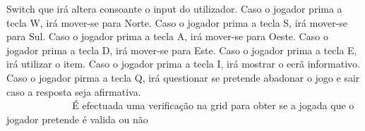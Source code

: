 Switch que irá altera consoante o input do utilizador. Caso o jogador prima a tecla W, irá mover-\/se para Norte. Caso o jogador prima a tecla S, irá mover-\/se para Sul. Caso o jogador prima a tecla A, irá mover-\/se para Oeste. Caso o jogador prima a tecla D, irá mover-\/se para Este. Caso o jogador prima a tecla E, irá utilizar o item. Caso o jogador prima a tecla I, irá mostrar o ecrã informativo. Caso o jogador pirma a tecla Q, irá questionar se pretende abadonar o jogo e sair caso a resposta seja afirmativa. ~\newline
~\newline
~\newline
~\newline
~\newline
~\newline
~\newline
~\newline
~\newline
~\newline
~\newline
~\newline
~\newline
~\newline
~\newline
~\newline
~\newline
~\newline
~\newline
~\newline
~\newline
~\newline
~\newline
~\newline
~\newline
~\newline
~\newline
~\newline
~\newline
~\newline
~\newline
~\newline
~\newline
~\newline
 É efectuada uma verificação na grid para obter se a jogada que o jogador pretende é valida ou não ~\newline
~\newline
~\newline
~\newline
~\newline
~\newline
